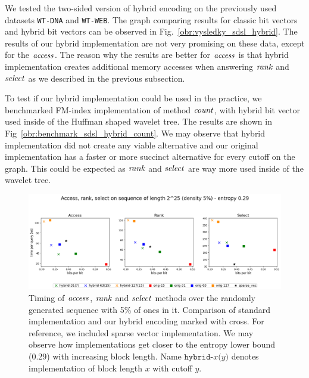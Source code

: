 We tested the two-sided version of hybrid encoding on the previously used datasets \texttt{WT-DNA}
and \texttt{WT-WEB}. The graph comparing results for classic bit vectors and hybrid bit vectors
can be observed in Fig.~\ref{obr:vysledky_sdsl_hybrid}. The results of our hybrid implementation
are not very promising on these data, except for the $\mathit{access}$. The reason why the results are
better for $\mathit{access}$ is that hybrid implementation creates additional memory accesses when answering
$\mathit{rank}$ and $\mathit{select}$ as we described in the previous subsection.

To test if our hybrid implementation could be used in the practice, we benchmarked FM-index
implementation of method $\mathit{count}$, with hybrid bit vector used inside of the Huffman shaped
wavelet tree. The results are shown in Fig~\ref{obr:benchmark_sdsl_hybrid_count}. We may observe
that hybrid implementation did not create any viable alternative and our original implementation
has a faster or more succinct alternative for every cutoff on the graph. This could be expected
as $\mathit{rank}$ and $\mathit{select}$ are way more used inside of the wavelet tree.

\begin{figure}
	\centerline{
		\includegraphics[width=\textwidth, height=0.27\textheight]{images/vysledky_hybrid_artif}
	}
	\caption[TODO]{Timing of $\mathit{access}$, $\mathit{rank}$ and $\mathit{select}$ methods over the randomly generated
	sequence with 5\% of ones in it. Comparison of standard implementation and our hybrid encoding
	marked with cross. For reference, we included sparse vector implementation. We may observe how
	implementations get closer to the entropy lower bound (0.29) with increasing block length. Name
	$\texttt{hybrid-}x\texttt{(}y\texttt{)}$ denotes implementation of block length $x$ with cutoff $y$.
	}
	\label{obr:vysledky_hybrid_artif}
\end{figure}

